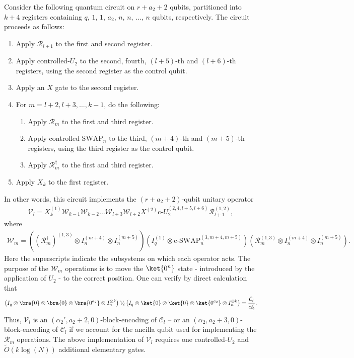 \documentclass[superscriptaddress,onecolumn,nofootinbib,longbibliography,a4paper,accepted=2026-09-29]{quantumarticle}
\theoremstyle{plain}
\theoremstyle{definition}
\numberwithin{thm}{section}
\numberwithin{assumption}{section}
\numberwithin{lemma}{section}
\numberwithin{prop}{section}
\numberwithin{cor}{section}
\numberwithin{definition}{section}
\numberwithin{rmk}{section}
\numberwithin{equation}{section}
\newcommand{\lrb}[1]{\left ( #1 \right )}
\newcommand{\mylog}[1]{\operatorname{log} \lrb{#1}}
\newcommand{\mytO}[1]{\tilde{O}\lrb{#1}}
\begin{document}
Consider the following quantum circuit on $r +a_2+2$ qubits, partitioned into $k+4$ registers containing $q$, $1$, $1$, $a_2$, $n$, $n$, $\dots$, $n$ qubits, respectively. The circuit proceeds as follows:
\begin{enumerate}
    \item Apply $\mathcal{R}_{l+1}$ to the first and second register.
    \item Apply controlled-$U_2$ to the second, fourth, $(l+5)$-th and $(l+6)$-th registers, using the second register as the control qubit.   \item Apply an $X$ gate to the second register.
    \item For $m=l+2, l+3, \dots, k-1$, do the following:
    \begin{enumerate}
        \item Apply $\mathcal{R}_m$ to the first and third register.
        \item Apply controlled-$\mathrm{SWAP}_n$ to the third, $(m+4)$-th and $(m+5)$-th registers, using the third register as the control qubit.
        \item Apply $\mathcal{R}_m^{\dagger}$ to the first and third register.
    \end{enumerate}
    \item Apply $X_k$ to the first register. 
\end{enumerate}
In other words, this circuit implements the $(r+a_2+2)$-qubit unitary operator
\begin{align}
    \mathcal{V}_l=X_k^{(1)} 
    \mathcal{W}_{k-1} 
    \mathcal{W}_{k-2}\dots \mathcal{W}_{l+3}
    \mathcal{W}_{l+2}
    X^{(2)}\text{c-}U_2^{(2, 4,l+5, l+6)}\mathcal{R}_{l+1}^{(1,2)} ,
\end{align}
where
\begin{align}
    \mathcal{W}_m = \lrb{(\mathcal{R}_m^\dagger)^{(1,3)} \otimes I_n^{(m+4)} \otimes I_n^{(m+5)}}
    \lrb{I_q^{(1)} \otimes \text{c-}\mathrm{SWAP}_n^{(3,m+4,m+5)}}
    \lrb{\mathcal{R}_m^{(1,3)} \otimes I_n^{(m+4)} \otimes I_n^{(m+5)}}.
\end{align}
Here the superscripts indicate the subsystems on which each operator acts. The purpose of the $\mathcal{W}_m$ operations is to move the $\ket{0^n}$ state - introduced by the application of $U_2$ - to the correct position. One can verify by direct calculation that
\begin{align}
    \lrb{I_q \otimes \bra{0} \otimes \bra{0} \otimes \bra{0^{a_2}} \otimes I_n^{\otimes k}}\mathcal{V}_l
    \lrb{I_q \otimes \ket{0} \otimes \ket{0} \otimes \ket{0^{a_2}} \otimes I_n^{\otimes k}}    
    =\frac{\mathcal{C}_l}{\alpha_2'}.    
\end{align}
Thus, $\mathcal{V}_l$ is an $(\alpha_2', a_2+2, 0)$-block-encoding of $\mathcal{C}_l$ -- or  
an $(\alpha_2, a_2+3, 0)$-block-encoding of $\mathcal{C}_l$ if we account for the ancilla qubit used for implementing the $\mathcal{R}_m$ operations. 
The above implementation of $\mathcal{V}_l$ requires one controlled-$U_2$ and $\mytO{k\mylog{N}}$ additional elementary gates. 
\end{document}

